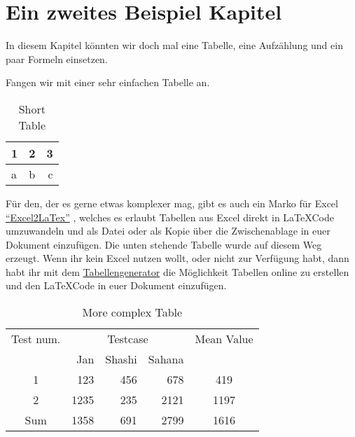 \chapter{Ein zweites Beispiel Kapitel}

In diesem Kapitel könnten wir doch mal eine Tabelle, eine Aufzählung und ein paar Formeln einsetzen.

Fangen wir mit einer sehr einfachen Tabelle an. 

\begin{table}[h!]
  \centering
  \caption{Short Table}  %
  \begin{tabular}{l|c||r}
    1 & 2 & 3\\
    \hline
    a & b & c\\
  \end{tabular}
    \label{tab:easyTab}%
\end{table}

Für den, der es gerne etwas komplexer mag, gibt es auch ein  Marko für Excel \href{https://www.ctan.org/pkg/excel2latex?lang=de}{\enquote{Excel2LaTex}} \autocite{MarkroExcel}, welches es erlaubt Tabellen aus Excel direkt in \LaTeX Code umzuwandeln und als Datei oder als Kopie über die Zwischenablage in euer Dokument einzufügen. Die unten stehende Tabelle wurde auf diesem Weg erzeugt. Wenn ihr kein Excel nutzen wollt, oder nicht zur Verfügung habt, dann habt ihr mit dem  \href{http://www.tablesgenerator.com}{Tabellengenerator} \autocite{TabGen} die Möglichkeit Tabellen online zu erstellen und den \LaTeX Code in euer Dokument einzufügen. 

\begin{table}[!htbp]
  \centering
  \caption{More complex Table} %
    \begin{tabular}{crrrc} \toprule
    Test num. & \multicolumn{3}{c}{Testcase} & Mean Value\\ \cmidrule{2-4}
              &  Jan & Shashi & Sahana       &           \\ \midrule
        1     &  123 & 456    & 678          &   419     \\
        2     & 1235 & 235    & 2121         &   1197    \\ \midrule
        Sum   & 1358 & 691    & 2799         &   1616    \\ \bottomrule 
	\end{tabular}%
  \label{tab:complexTab}%
\end{table}%

